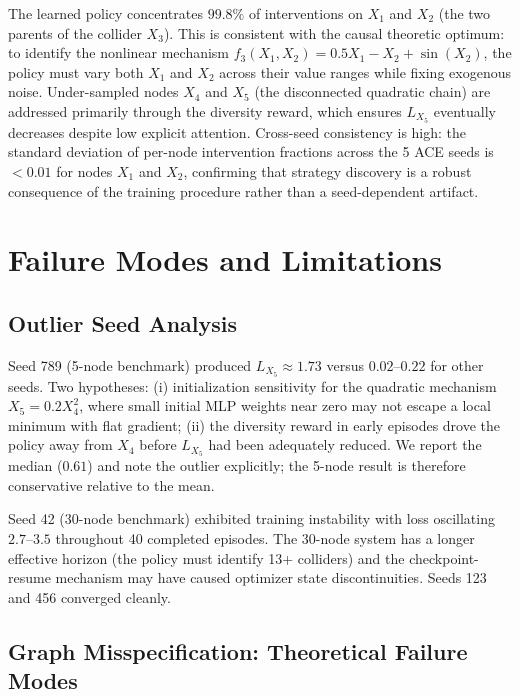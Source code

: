 The learned policy concentrates $99.8\%$ of interventions on $X_1$ and $X_2$ (the two parents of the collider $X_3$). This is consistent with the causal theoretic optimum: to identify the nonlinear mechanism $f_3(X_1, X_2) = 0.5 X_1 - X_2 + \sin(X_2)$, the policy must vary both $X_1$ and $X_2$ across their value ranges while fixing exogenous noise. Under-sampled nodes $X_4$ and $X_5$ (the disconnected quadratic chain) are addressed primarily through the diversity reward, which ensures $L_{X_5}$ eventually decreases despite low explicit attention. Cross-seed consistency is high: the standard deviation of per-node intervention fractions across the 5 ACE seeds is $<0.01$ for nodes $X_1$ and $X_2$, confirming that strategy discovery is a robust consequence of the training procedure rather than a seed-dependent artifact.

\section{Failure Modes and Limitations}
\label{app:failures}

\subsection{Outlier Seed Analysis}
\label{app:outlier}

Seed 789 (5-node benchmark) produced $L_{X_5} \approx 1.73$ versus $0.02$--$0.22$ for other seeds. Two hypotheses: (i) initialization sensitivity for the quadratic mechanism $X_5 = 0.2 X_4^2$, where small initial MLP weights near zero may not escape a local minimum with flat gradient; (ii) the diversity reward in early episodes drove the policy away from $X_4$ before $L_{X_5}$ had been adequately reduced. We report the median ($0.61$) and note the outlier explicitly; the 5-node result is therefore conservative relative to the mean.

Seed 42 (30-node benchmark) exhibited training instability with loss oscillating $2.7$--$3.5$ throughout 40 completed episodes. The 30-node system has a longer effective horizon (the policy must identify 13+ colliders) and the checkpoint-resume mechanism may have caused optimizer state discontinuities. Seeds 123 and 456 converged cleanly.

\subsection{Graph Misspecification: Theoretical Failure Modes}
\label{app:misspec-failures}

